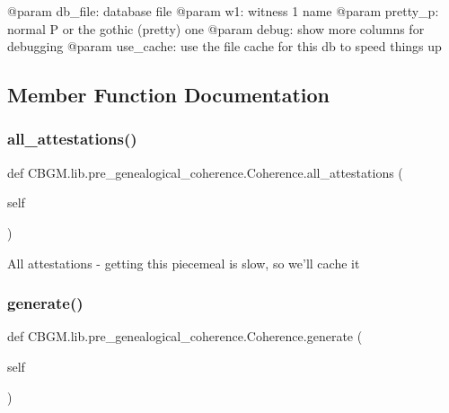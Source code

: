 \begin{DoxyVerb}@param db_file: database file
@param w1: witness 1 name
@param pretty_p: normal P or the gothic (pretty) one
@param debug: show more columns for debugging
@param use_cache: use the file cache for this db to speed things up
\end{DoxyVerb}
 

\subsection{Member Function Documentation}
\mbox{\label{classCBGM_1_1lib_1_1pre__genealogical__coherence_1_1Coherence_a3cce8769d2fb90b5290231dc8fffb949}} 
\subsubsection{\texorpdfstring{all\+\_\+attestations()}{all\_attestations()}}
{\footnotesize\ttfamily def C\+B\+G\+M.\+lib.\+pre\+\_\+genealogical\+\_\+coherence.\+Coherence.\+all\+\_\+attestations (\begin{DoxyParamCaption}\item[{}]{self }\end{DoxyParamCaption})}

\begin{DoxyVerb}All attestations - getting this piecemeal is slow, so we'll cache it
\end{DoxyVerb}
 \mbox{\label{classCBGM_1_1lib_1_1pre__genealogical__coherence_1_1Coherence_a08998731ef4735695399d884926caa1f}} 
\subsubsection{\texorpdfstring{generate()}{generate()}}
{\footnotesize\ttfamily def C\+B\+G\+M.\+lib.\+pre\+\_\+genealogical\+\_\+coherence.\+Coherence.\+generate (\begin{DoxyParamCaption}\item[{}]{self }\end{DoxyParamCaption})}


